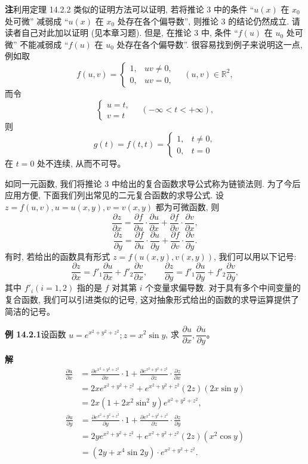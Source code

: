 \documentclass[UTF8, 12pt, fontset=fandol, oneside]{ctexart}
\begin{document}
\noindent\textbf{注}\quad 利用定理 14.2.2 类似的证明方法可以证明, 若将推论 3 中的条件 ``$u(x)$ 在 $x_0$ 处可微'' 减弱成 ``$u(x)$ 在 $x_0$ 处存在各个偏导数'', 则推论 3 的结论仍然成立. 请读者自己对此加以证明 (见本章习题). 但是, 在推论 3 中, 条件 ``$f(u)$ 在 $u_0$ 处可微'' 不能减弱成 ``$f(u)$ 在 $u_0$ 处存在各个偏导数''. 很容易找到例子来说明这一点, 例如取
\[
  f(u,v)=
  \begin{cases}
    1, &uv\ne0,\\
    0, &uv=0,
  \end{cases}
  \quad (u,v)\in\mathbb R^2,
\]
而令
\[
  \begin{cases}
    u=t,\\
    v=t
  \end{cases}
  \quad(-\infty<t<+\infty),
\]
则
\[
  g(t)=f(t,t)=
  \begin{cases}
    1, &t\ne0,\\
    0, &t=0
  \end{cases}
\]
在 $t=0$ 处不连续, 从而不可导。

如同一元函数, 我们将推论 3 中给出的复合函数求导公式称为链锁法则. 为了今后应用方便, 下面我们列出常见的二元复合函数的求导公式. 设 $z=f(u,v), u=u(x,y), v=v(x,y)$ 都为可微函数, 则
\[
  \frac{\partial z}{\partial x}
  =\frac{\partial f}{\partial u}\cdot\frac{\partial u}{\partial x}
  +\frac{\partial f}{\partial v}\cdot\frac{\partial v}{\partial x},
\]
\[
  \frac{\partial z}{\partial y}
  =\frac{\partial f}{\partial u}\cdot\frac{\partial u}{\partial y}
  +\frac{\partial f}{\partial v}\cdot\frac{\partial v}{\partial y}.
\]
有时, 若给出的函数具有形式 $z=f(u(x,y),v(x,y))$, 我们可以用以下记号:
\[
  \frac{\partial z}{\partial x}=f'_1\frac{\partial u}{\partial x}+f'_2\frac{\partial v}{\partial x},
  \qquad
  \frac{\partial z}{\partial y}=f'_1\frac{\partial u}{\partial y}+f'_2\frac{\partial v}{\partial y},
\]
其中 $f'_i(i=1,2)$ 指的是 $f$ 对其第 $i$ 个变量求偏导数. 对于具有多个中间变量的复合函数, 我们可以引进类似的记号, 这对抽象形式给出的函数的求导运算提供了简洁的记号。

\noindent\textbf{例 14.2.1}\quad 设函数 $u=e^{x^2+y^2+z^2}; z=x^2\sin y$, 求 $\dfrac{\partial u}{\partial x}, \dfrac{\partial u}{\partial y}$。

\noindent\textbf{解}\quad
\[
\begin{aligned}
  \frac{\partial u}{\partial x}
  &=\frac{\partial e^{x^2+y^2+z^2}}{\partial x}\cdot1
  +\frac{\partial e^{x^2+y^2+z^2}}{\partial z}\cdot\frac{\partial z}{\partial x}\\
  &=2xe^{x^2+y^2+z^2}+e^{x^2+y^2+z^2}(2z)(2x\sin y)\\
  &=2x(1+2x^2\sin^2 y)e^{x^2+y^2+z^2},
\end{aligned}
\]
\[
\begin{aligned}
  \frac{\partial u}{\partial y}
  &=\frac{\partial e^{x^2+y^2+z^2}}{\partial y}\cdot1
  +\frac{\partial e^{x^2+y^2+z^2}}{\partial z}\cdot\frac{\partial z}{\partial y}\\
  &=2ye^{x^2+y^2+z^2}+e^{x^2+y^2+z^2}(2z)(x^2\cos y)\\
  &=(2y+x^4\sin2y)\cdot e^{x^2+y^2+z^2}.
\end{aligned}
\]
\end{document}
